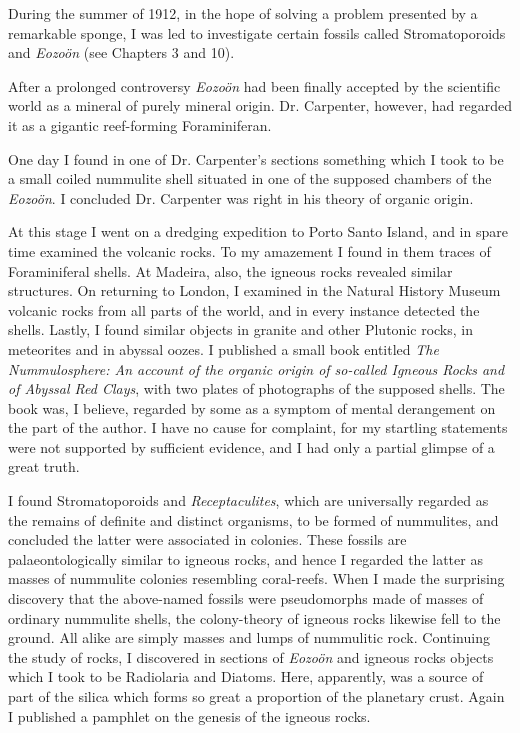 \documentclass[a4paper, 12pt, oneside]{article}
\begin{document}
During the summer of 1912, in the hope of solving a problem presented by a remarkable sponge, I was led to investigate certain fossils called Stromatoporoids and \emph{Eozoön} (see Chapters 3 and 10).

After a prolonged controversy \emph{Eozoön} had been finally accepted by the scientific world as a mineral of purely mineral origin. Dr. Carpenter, however, had regarded it as a gigantic reef-forming Foraminiferan.

One day I found in one of Dr. Carpenter's sections something which I took to be a small coiled nummulite shell situated in one of the supposed chambers of the \emph{Eozoön}. I concluded Dr. Carpenter was right in his theory of organic origin.

At this stage I went on a dredging expedition to Porto Santo Island, and in spare time examined the volcanic rocks. To my amazement I found in them traces of Foraminiferal shells. At Madeira, also, the igneous rocks revealed similar structures. On returning to London, I examined in the Natural History Museum volcanic rocks from all parts of the world, and in every instance detected the shells. Lastly, I found similar objects in granite and other Plutonic rocks, in meteorites and in abyssal oozes. I published a small book entitled \emph{The Nummulosphere: An account of the organic origin of so-called Igneous Rocks and of Abyssal Red Clays}, with two plates of photographs of the supposed shells. The book was, I believe, regarded by some as a symptom of mental derangement on the part of the author. I have no cause for complaint, for my startling statements were not supported by sufficient evidence, and I had only a partial glimpse of a great truth.

I found Stromatoporoids and \emph{Receptaculites}, which are universally regarded as the remains of definite and distinct organisms, to be formed of nummulites, and concluded the latter were associated in colonies. These fossils are palaeontologically similar to igneous rocks, and hence I regarded the latter as masses of nummulite colonies resembling coral-reefs. When I made the surprising discovery that the above-named fossils were pseudomorphs made of masses of ordinary nummulite shells, the colony-theory of igneous rocks likewise fell to the ground. All alike are simply masses and lumps of nummulitic rock. Continuing the study of rocks, I discovered in sections of \emph{Eozoön} and igneous rocks objects which I took to be Radiolaria and Diatoms. Here, apparently, was a source of part of the silica which forms so great a proportion of the planetary crust. Again I published a pamphlet on the genesis of the igneous rocks.
\end{document}
